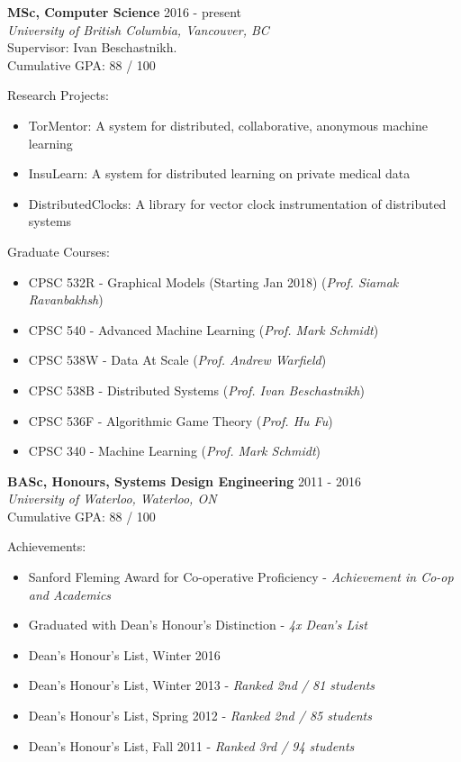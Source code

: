 \documentclass[10pt]{res} %
\begin{document}
\begin{resume}
\vspace{0.2in} %

\textbf {MSc, Computer Science} \hfill 2016 - present \\ 
{\sl University of British Columbia, Vancouver, BC} \\
Supervisor: Ivan Beschastnikh. \\
Cumulative GPA: 88 / 100

Research Projects:
\begin{itemize}   
    \item TorMentor: A system for distributed, collaborative, anonymous
    machine learning
    \item InsuLearn: A system for distributed learning on private
    medical data
    \item DistributedClocks: A library for vector clock instrumentation
    of distributed systems
\end{itemize}

Graduate Courses:
\begin{itemize} 
    \item CPSC 532R - Graphical Models (Starting Jan 2018) (\emph{Prof.
    Siamak Ravanbakhsh})
    \item CPSC 540 - Advanced Machine Learning (\emph{Prof. Mark
    Schmidt})
    \item CPSC 538W - Data At Scale (\emph{Prof. Andrew Warfield})
    \item CPSC 538B - Distributed Systems (\emph{Prof. Ivan
    Beschastnikh})
    \item CPSC 536F - Algorithmic Game Theory (\emph{Prof. Hu Fu})
    \item CPSC 340 - Machine Learning (\emph{Prof. Mark Schmidt})
\end{itemize}

\textbf {BASc, Honours, Systems Design Engineering} \hfill 2011 - 2016 \\ 
{\sl University of Waterloo, Waterloo, ON} \\
Cumulative GPA: 88 / 100

Achievements:
\begin{itemize} 
    \item Sanford Fleming Award for Co-operative Proficiency - {\sl
    Achievement in Co-op and Academics}
    \item Graduated with Dean's Honour's Distinction - {\sl 4x Dean's List}
    \item Dean's Honour's List, Winter 2016
    \item Dean's Honour's List, Winter 2013 - {\sl Ranked 2nd / 81 students}
    \item Dean's Honour's List, Spring 2012 - {\sl Ranked 2nd / 85 students}
    \item Dean's Honour's List, Fall 2011 - {\sl Ranked 3rd / 94 students}
\end{itemize}


\end{resume}
\end{document}
